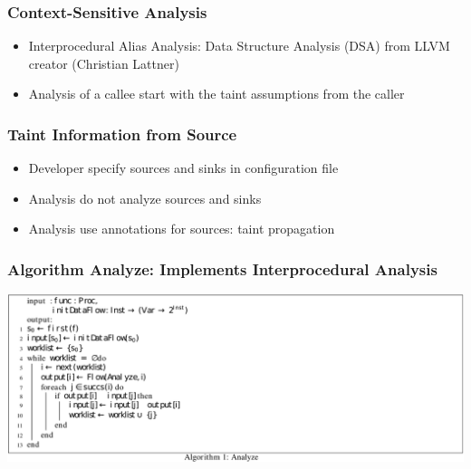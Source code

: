 \documentclass[xcolor=dvipsnames]{beamer}
\begin{document}
\begin{frame}
  \frametitle{Context-Sensitive Analysis} {
   \Large
   \begin{itemize}
   \item Interprocedural Alias Analysis: Data Structure Analysis (DSA) from LLVM creator (Christian Lattner)
   \item Analysis of a callee start with the taint assumptions from the caller
	\end{itemize}
	}
\end{frame}

\begin{frame}
  \frametitle{Taint Information from Source} 
    {\Large
	\begin{itemize}
	\item Developer specify sources and sinks in configuration file
   	\vspace{0.2cm}	
   	\item Analysis do not analyze sources and sinks
   	\vspace{0.2cm}	     	   		   	
   	\item Analysis use annotations for sources: taint propagation
   	\end{itemize}
	}
\end{frame}

\begin{frame}
  \frametitle{Algorithm Analyze: Implements Interprocedural Analysis} 
    {\small
	\begin{center}
	\includegraphics[scale=0.65]{analyze}
	\end{center}   
	}
\end{frame}
\end{document}
